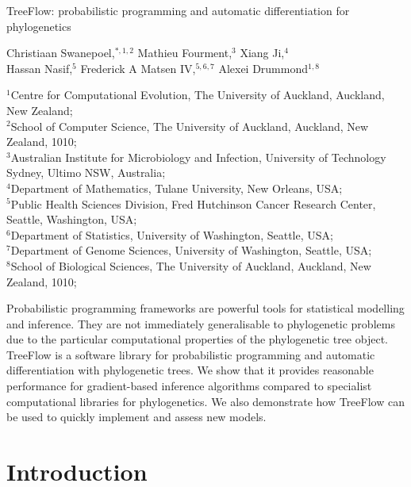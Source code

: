 
TreeFlow: probabilistic programming and automatic differentiation for phylogenetics

Christiaan Swanepoel,$^{\ast, 1, 2}$
Mathieu Fourment,$^{3}$
Xiang Ji,$^{4}$\\
Hassan Nasif,$^{5}$
Frederick A Matsen IV,$^{5,6,7}$
Alexei Drummond$^{1, 8}$

${^1}$Centre for Computational Evolution, The University of Auckland, Auckland, New Zealand;\\
$^{2}$School of Computer Science, The University of Auckland, Auckland, New Zealand, 1010;\\
$^{3}$Australian Institute for Microbiology and Infection, University of Technology Sydney, Ultimo NSW, Australia;\\
$^{4}$Department of Mathematics, Tulane University, New Orleans, USA;\\
$^{5}$Public Health Sciences Division, Fred Hutchinson Cancer Research Center, Seattle, Washington, USA;\\
$^{6}$Department of Statistics, University of Washington, Seattle, USA;\\
$^{7}$Department of Genome Sciences, University of Washington, Seattle, USA;\\
$^{8}$School of Biological Sciences, The University of Auckland, Auckland, New Zealand, 1010;\\

\usepackage{booktabs}
\usepackage[outputdir=]{minted}
\usepackage{multirow}

Probabilistic programming frameworks are powerful tools for statistical modelling and inference. They are not immediately generalisable to phylogenetic problems due to the particular computational properties of the phylogenetic tree object. TreeFlow is a software library for probabilistic programming and automatic differentiation with phylogenetic trees. We show that it provides reasonable performance for gradient-based inference algorithms compared to specialist computational libraries for phylogenetics. We also demonstrate how TreeFlow can be used to quickly implement and assess new models.

\section{Introduction}

